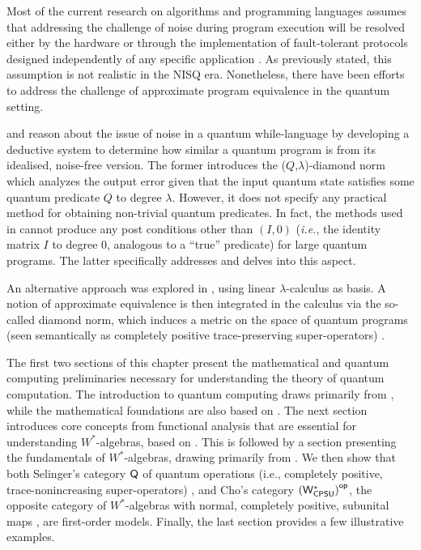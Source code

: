 Most of the current research on algorithms and programming languages assumes that addressing the challenge of noise during program execution will be resolved either by the hardware or through the implementation of fault-tolerant protocols designed independently of any specific application \cite{chong2017programming}. As previously stated, this assumption is not realistic in the NISQ era. Nonetheless, there have been efforts to address the challenge of approximate program equivalence in the quantum setting. 

\cite{hung2019quantitative} and \cite{tao2021gleipnir} reason about the issue of noise in a quantum while-language by developing a deductive system to determine how similar a quantum program is from its idealised, noise-free version. The former introduces the ($Q$,$\lambda$)-diamond norm which analyzes the output error given that the input quantum state satisfies some quantum predicate $Q$ to degree $\lambda$. However, it does not specify any practical method for obtaining non-trivial quantum predicates. In fact, the methods used in \cite{hung2019quantitative} cannot produce any post conditions other than $(I,0)$ (\textit{i.e.}, the identity matrix $I$ to degree 0, analogous to a ``true” predicate) for large quantum programs. The latter specifically addresses and delves into this aspect.  

An alternative approach was explored in \cite{dahlqvist2023syntactic}, using linear $\lambda$-calculus as basis. A notion of approximate equivalence is then
integrated in the calculus via the so-called diamond norm, which induces a metric on the space of quantum programs (seen semantically as completely positive trace-preserving super-operators) \cite{watrous2018theory}. 


\vspace{20pt}

The first two sections of this chapter present the mathematical and quantum computing preliminaries necessary for understanding the theory of quantum computation. The introduction to quantum computing draws primarily from \cite{nielsen2010quantum,watrous2018theory}, while the mathematical foundations are also based on \cite{heinosaariMathematicalLanguageQuantum2011,conwayCourseFunctionalAnalysis2007,conwayCourseOperatorTheory2000}.
The next section introduces core concepts from functional analysis that are essential for understanding \( W^* \)-algebras, based on \cite{rudin91functional,InfiniteDimensionalAnalysis2006}. This is followed by a section presenting the fundamentals of \( W^* \)-algebras, drawing primarily from \cite{sakaiCAlgebrasWAlgebras1998,takesakiTheoryOperatorAlgebras1979,westerbaanCategoryNeumannAlgebras2019}.
We then show that both Selinger’s category 
$\mathsf{Q}$ of quantum operations (i.e., completely positive, trace-nonincreasing super-operators) \cite{selinger2004towards}, and Cho’s category 
$\left(\mathsf{W^*_{CPSU}}\right)^{\mathsf{op}}$, the opposite category of \( W^* \)-algebras with normal, completely positive, subunital maps \cite{choSemanticsQuantumProgramming2016}, are first-order models.
Finally, the last section provides a few illustrative examples.







